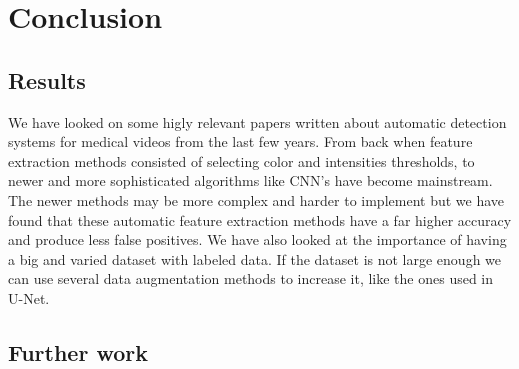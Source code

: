 \documentclass[thesis.tex]{subfiles}
\begin{document}
\chapter{Conclusion} \label{conclusion}

\section{Results}
We have looked on some higly relevant papers written about automatic detection systems for medical videos from the last few years. From back when feature extraction methods consisted of selecting color and intensities thresholds, to newer and more sophisticated algorithms like CNN's have become mainstream. The newer methods may be more complex and harder to implement but we have found that these automatic feature extraction methods have a far higher accuracy and produce less false positives. We have also looked at the importance of having a big and varied dataset with labeled data. If the dataset is not large enough we can use several data augmentation methods to increase it, like the ones used in U-Net. 

\section{Further work}
\end{document}
